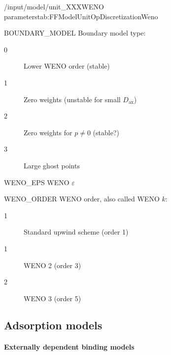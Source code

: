\begin{subgroup}{/input/model/unit\_XXX}{WENO parameters}{tab:FFModelUnitOpDiscretizationWeno}
  \begin{dataset}[type=int,range={$\{ 0,1,2,3 \}$},length=1]{BOUNDARY\_MODEL}
    Boundary model type:
    \begin{description}
      \item[0] Lower WENO order (stable)
      \item[1] Zero weights (unstable for small $D_{\mathrm{ax}}$)
      \item[2] Zero weights for $p \neq 0$ (stable?)
      \item[3] Large ghost points
    \end{description}\vspace{-\baselineskip}
  \end{dataset}
  \begin{dataset}[type=double,range={$\geq 0$},length=1]{WENO\_EPS}
    WENO $\varepsilon$
  \end{dataset}
  \begin{dataset}[type=int,range={$\{ 1,2,3 \}$},length=1]{WENO\_ORDER}
    WENO order, also called WENO $k$:
    \begin{description}
      \item[1] Standard upwind scheme (order 1)
      \item[1] WENO 2 (order 3)
      \item[2] WENO 3 (order 5)
    \end{description}\vspace{-\baselineskip}
  \end{dataset}
\end{subgroup}

\subsection{Adsorption models}\label{sec:FFAdsorption}

\paragraph{Externally dependent binding models}

